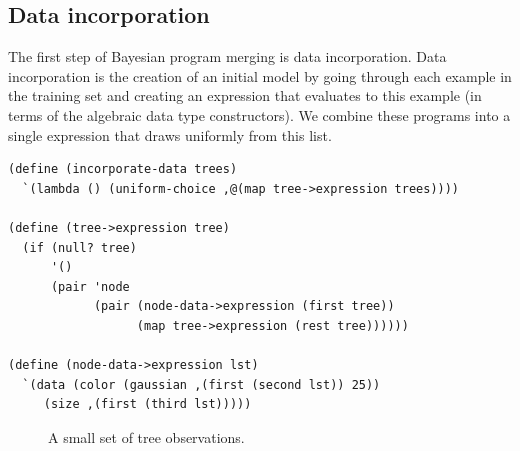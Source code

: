 \documentclass[a4paper,10pt]{article}
\begin{document}
\subsection{Data incorporation}
The first step of Bayesian program merging is data incorporation.  Data incorporation is the creation of an initial model by going through each example in the training set and creating an expression that evaluates to this example (in terms of the algebraic data type constructors).  We combine these programs into a single expression that draws uniformly from this list.
\begin{lstlisting}[frame=trblsingle]
(define (incorporate-data trees)
  `(lambda () (uniform-choice ,@(map tree->expression trees))))

(define (tree->expression tree)
  (if (null? tree)
      '()
      (pair 'node
            (pair (node-data->expression (first tree)) 
                  (map tree->expression (rest tree))))))

(define (node-data->expression lst)
  `(data (color (gaussian ,(first (second lst)) 25)) 
	 (size ,(first (third lst)))))
\end{lstlisting}

\begin{figure}[t]
  \subfloat{}
  \hspace{40pt} %
\caption{A small set of tree observations.}
\label{fig:tree-obs}
\end{figure}
\end{document}

